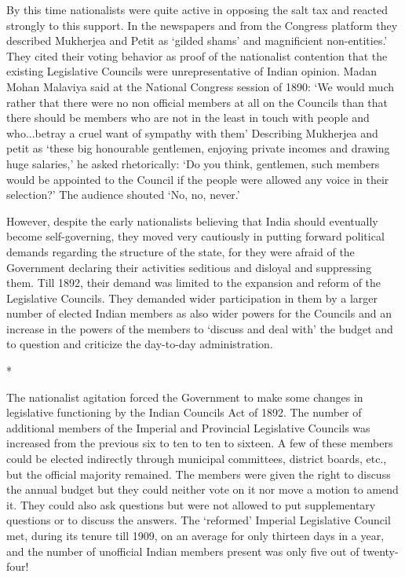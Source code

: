 By this time nationalists were quite active in opposing the salt tax and reacted strongly to this support. In the newspapers and from the Congress platform they described Mukherjea and Petit as ‘gilded shams’ and magnificient non-entities.’ They cited their voting behavior as proof of the nationalist contention that the existing Legislative Councils were unrepresentative of Indian opinion. Madan Mohan Malaviya said at the National Congress session of 1890: ‘We would much rather that there were no non­ official members at all on the Councils than that there should be members who are not in the least in touch with people and who...betray a cruel want of sympathy with them’ Describing Mukherjea and petit as ‘these big honourable gentlemen, enjoying private incomes and drawing huge salaries,’ he asked rhetorically: ‘Do you think, gentlemen, such members would be appointed to the Council if the people were allowed any voice in their selection?’ The audience shouted ‘No, no, never.’

However, despite the early nationalists believing that India should eventually become self-governing, they moved very cautiously in putting forward political demands regarding the structure of the state, for they were afraid of the Government declaring their activities seditious and disloyal and suppressing them. Till 1892, their demand was limited to the expansion and reform of the Legislative Councils. They demanded wider participation in them by a larger number of elected Indian members as also wider powers for the Councils and an increase in the powers of the members to ‘discuss and deal with’ the budget and to question and criticize the day-to-day administration.

\begin{center}*\end{center}



The nationalist agitation forced the Government to make some changes in legislative functioning by the Indian Councils Act of 1892. The number of additional members of the Imperial and Provincial Legislative Councils was increased from the previous six to ten to ten to sixteen. A few of these members could be elected indirectly through municipal committees, district boards, etc., but the official majority remained. The members were given the right to discuss the annual budget but they could neither vote on it nor move a motion to amend it. They could also ask questions but were not allowed to put supplementary questions or to discuss the answers. The ‘reformed’ Imperial Legislative Council met, during its tenure till 1909, on an average for only thirteen days in a year, and the number of unofficial Indian members present was only five out of twenty- four!

